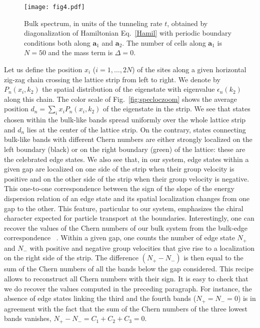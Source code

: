 \documentclass[aps,pra,showpacs,twocolumn,superscriptaddress]{revtex4-1}
\begin{document}
\begin{figure}[t!p]
	\texttt{[image: fig4.pdf]}
	\caption{\label{fig:bulkk2} Bulk spectrum, in units of the tunneling rate $t$, 
	obtained by diagonalization of Hamiltonian Eq.~\eqref{Hamil} with periodic boundary conditions 
	both along $\mathbf{a}_1$ and $\mathbf{a}_2$. The number of cells along 
	$\mathbf{a}_1$ is $N=50$ and the mass term is $\Delta=0$. 	}
\end{figure}

Let us define the position $x_i$ ($i=1, \hdots, 2N$) of the sites along a given 
horizontal zig-zag chain crossing the lattice strip from left to right. We denote by $P_n(x_i, k_2)$ 
the spatial distribution of the eigenstate with eigenvalue $\epsilon_n(k_2)$ along this chain. 
The color scale of Fig.~\ref{fig:specloczoom} shows the average position 
$d_n = \sum_i x_i P_n(x_i, k_2)$ of the eigenstate in the strip. We see that states chosen 
within the bulk-like bands spread uniformly over the whole lattice strip and $d_n$ lies at the center 
of the lattice strip. On the contrary, states connecting bulk-like bands with different Chern numbers 
are either strongly localized on the left boundary (black) or on the right boundary (green) of the lattice: 
these are the celebrated edge states. 
We also see that, in our system, edge states within a given gap are localized on one side 
of the strip when their group velocity is positive and on the other side of the strip when 
their group velocity is negative. This one-to-one correspondence between the sign of the slope of 
the energy dispersion relation of an edge state and its spatial localization changes from one gap to the other. 
This feature, particular to our system, emphasizes the chiral character expected for particle transport at 
the boundaries. Interestingly, one can recover the values of the Chern numbers of our bulk system from 
the bulk-edge correspondence ~\cite{Hatsugai1993a,Hatsugai1993b,Hatsugai1997}. Within a given gap, 
one counts the number of edge state $N_+$ and $N_-$ with positive and negative group velocities 
that give rise to a localization on the right side of the strip. The difference $(N_+-N_-)$ is 
then equal to the sum of the Chern numbers of all the bands below the gap considered. This recipe 
allows to reconstruct all Chern numbers with their sign. It is easy to check that we do recover 
the values computed in the preceding paragraph. 
For instance, the absence of edge states linking the third and the fourth bands ($N_+=N_-=0$) is 
in agreement with the fact that the sum of the Chern numbers of the three lowest bands vanishes, $N_+-N_- = C_1+C_2+C_3=0$.
		
\end{document}
